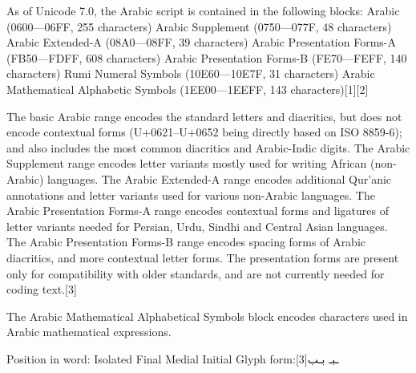 As of Unicode 7.0, the Arabic script is contained in the following blocks:
Arabic (0600—06FF, 255 characters)
Arabic Supplement (0750—077F, 48 characters)
Arabic Extended-A (08A0—08FF, 39 characters)
Arabic Presentation Forms-A (FB50—FDFF, 608 characters)
Arabic Presentation Forms-B (FE70—FEFF, 140 characters)
Rumi Numeral Symbols (10E60—10E7F, 31 characters)
Arabic Mathematical Alphabetic Symbols (1EE00—1EEFF, 143 characters)[1][2]

The basic Arabic range encodes the standard letters and diacritics, but does not encode contextual forms (U+0621–U+0652 being directly based on ISO 8859-6); and also includes the most common diacritics and Arabic-Indic digits. The Arabic Supplement range encodes letter variants mostly used for writing African (non-Arabic) languages. The Arabic Extended-A range encodes additional Qur'anic annotations and letter variants used for various non-Arabic languages. The Arabic Presentation Forms-A range encodes contextual forms and ligatures of letter variants needed for Persian, Urdu, Sindhi and Central Asian languages. The Arabic Presentation Forms-B range encodes spacing forms of Arabic diacritics, and more contextual letter forms. The presentation forms are present only for compatibility with older standards, and are not currently needed for coding text.[3] 

The Arabic Mathematical Alphabetical Symbols block encodes characters used in Arabic mathematical expressions.


Position in word:	Isolated	Final	Medial	Initial
Glyph form:\scalebox{3}[3]{ب}{ـب}‎	ـبـ‎	 \scalebox{3}{بـ}






